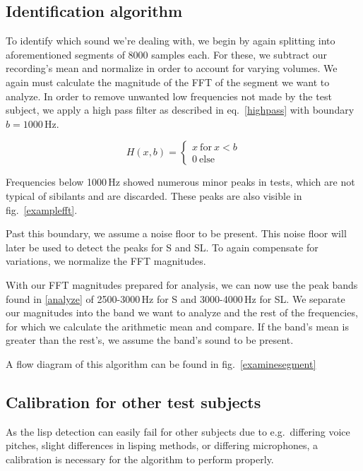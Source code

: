 \documentclass{IEEEtran}
\begin{document}
\subsection{Identification algorithm}\label{identify}

To identify which sound we're dealing with,
we begin by again splitting into aforementioned segments of 8000 samples each.
For these, we subtract our recording's mean and normalize in order to account for varying volumes.
We again must calculate the magnitude of the FFT of the segment we want to analyze.
In order to remove unwanted low frequencies not made by the test subject,
we apply a high pass filter as described in eq.\ \ref{highpass} with boundary \(b = 1000\)\,Hz.

\begin{equation}
H(x, b) = \begin{cases} x\ \mathrm{for}\ x < b \\ 0\ \mathrm{else} \end{cases}\label{highpass}
\end{equation}

Frequencies below 1000\,Hz showed numerous minor peaks in tests,
which are not typical of sibilants and are discarded.
These peaks are also visible in fig.\ \ref{examplefft}.

Past this boundary, we assume a noise floor to be present.
This noise floor will later be used to detect the peaks for S and SL.
To again compensate for variations, we normalize the FFT magnitudes.

With our FFT magnitudes prepared for analysis,
we can now use the peak bands found in \ref{analyze} of 2500-3000\,Hz for S and 3000-4000\,Hz for SL.
We separate our magnitudes into the band we want to analyze and the rest of the frequencies,
for which we calculate the arithmetic mean and compare.
If the band's mean is greater than the rest's,
we assume the band's sound to be present.

A flow diagram of this algorithm can be found in fig.\ \ref{examinesegment}

\subsection{Calibration for other test subjects}\label{calibration}

As the lisp detection can easily fail for other subjects due to e.g.\ differing voice pitches,
slight differences in lisping methods, or differing microphones,
a calibration is necessary for the algorithm to perform properly.
\end{document}
